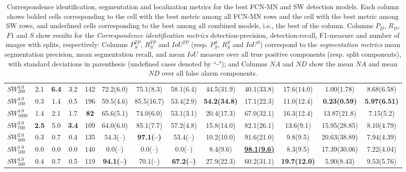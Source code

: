 \documentclass[a4paper,authoryear,review]{elsarticle}
\begin{document}
\begin{table}[]
\begin{adjustbox}{angle=90}
{\begin{tabular}{lcccccccccccc}
       \textbf{$SW_{200}^{4.0}$} & 2.1 & \textbf{6.4} & 3.2 & 142 & 72.2(6.0) & 75.1(8.3) & 58.1(6.4) & 44.5(31.9) & 40.1(33.8) & 17.6(14.0) & 1.00(1.78) & 8.68(6.58) \\
       \textbf{$SW_{100}^{4.0}$} & 0.3 & 1.4 & 0.5 & 196 & 59.5(4.6) & 85.5(16.7) & 53.4(2.9) & \textbf{54.2(34.8)} & 17.1(22.3) & 11.0(12.4) & \textbf{0.23(0.59)} & \textbf{5.97(6.51)} \\
       \textbf{$SW_{1000}^{4.0}$} & 1.4 & 2.1 & 1.7 & \textbf{82} & 65.6(5.1) & 74.0(6.0) & 53.1(3.1) & 20.4(17.3) & 67.0(32.1) & 16.3(12.4) & 13.87(21.8) & 7.15(5.2) \\
       \textbf{$SW_{700}^{3.0}$} & \textbf{2.5} & 5.0 & \textbf{3.4} & 109 & 64.0(6.0) & 85.1(7.7) & 57.2(4.8) & 15.8(14.0) & 82.1(26.1) & 13.6(9.1) & 15.95(28.85) & 8.10(4.79) \\
       \textbf{$SW_{600}^{2.0}$} & 0.3 & 0.7 & 0.4 & 135 & 54.3(--) & \textbf{97.1(--)} & 53.4(--) & 10.2(10.0) & 91.6(21.0) & 9.8(9.5) & 20.63(38.89) & 7.94(4.39) \\
       \textbf{$SW_{500}^{1.0}$} & 0.0 & 0.0 & 0.0 & 140 & 0.0(--) & 0.0(--) & 0.0(--) & 8.4(9.6) & {\ul \textbf{98.1(9.6)}} & 8.3(9.5) & 17.39(30.06) & 7.22(4.04) \\
       \textbf{$SW_{500}^{4.0}$} & 0.4 & 0.7 & 0.5 & 119 & \textbf{94.1(--)} & 70.1(--) & \textbf{67.2(--)} & 27.9(22.3) & 60.2(31.1) & \textbf{19.7(12.0)} & 5.90(8.43) & 9.53(5.76) \\ \hline
      \end{tabular}
     }
    \end{adjustbox}
     \caption{
    Correspondence identification, segmentation and localization metrics for the best FCN-MN and SW detection models. Each column shows bolded cells corresponding to the cell with the best metric among all FCN-MN rows and the cell with the best metric among SW rows, and underlined cells corresponding to the best among all combined models, i.e., the best of the column. Columns $P_D$, $R_D$, $F1$ and $S$ show results for the \emph{Correspondence identification metrics} detection-precision, detection-recall, F1-measure and number of images with splits, respectively: Columns $P_S^{TP}$, $R_S^{TP}$ and $IoU^{TP}$ (resp. $P_S^S$, $R_S^S$ and $IoU^S$) correspond to the \emph{segmentation metrics} mean segmentation precision, mean segmentation recall, and mean $IoU$ measure over all true positive components (resp. split components), with standard deviations in parenthesis (undefined cases denoted by ``-"); and Columns $NA$ and $ND$ show the mean $NA$ and mean $ND$ over all false alarm components. 
 }
 \label{tab:Table3}
\end{table}
\end{document}
